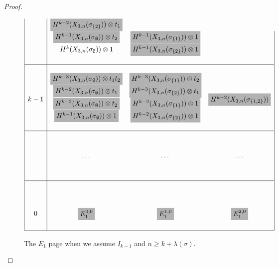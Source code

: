 \begin{proof}
\begin{figure}[ht]
\[\begin{array}{|c|ccc|}
      & \colorbox{isomorphism}{$H^{k-2}(X_{3,n}(\sigma_{\set{2}}))
        \otimes t_1$}
      & \\
      & \colorbox{isomorphism}{$H^{k-1}(X_{3,n}(\sigma_{\emptyset}))
        \otimes t_2 $} 
      & \colorbox{isomorphism}{$H^{k-1}(X_{3,n}(\sigma_{\set{1}}))
        \otimes 1$} &\\
      & H^k(X_{3,n}(\sigma_{\emptyset})) \otimes 1 
      & \colorbox{isomorphism}{$H^{k-1}(X_{3,n}(\sigma_{\set{2}}))
        \otimes 1$} &\\
      & & &\\
      \hline& & & \\
      \multirow{6}{*}{$k-1$}
      & \colorbox{isomorphism}{$H^{k-3}(X_{3,n}(\sigma_{\emptyset}))
        \otimes t_1t_2$}
      & \colorbox{isomorphism}{$H^{k-3}(X_{3,n}(\sigma_{\set{1}}))
        \otimes t_2$}
      & \multirow{6}{*}{\colorbox{isomorphism}{$
        H^{k-2}(X_{3,n}(\sigma_{\set{1,2}}))$}} \\
      & \colorbox{isomorphism}{$H^{k-2}(X_{3,n}(\sigma_{\emptyset}))
        \otimes t_1$}
      & \colorbox{isomorphism}{$H^{k-3}(X_{3,n}(\sigma_{\set{2}}))
        \otimes t_1$} &\\
      & \colorbox{isomorphism}{$H^{k-2}(X_{3,n}(\sigma_{\emptyset}))
        \otimes t_2 $}
      & \colorbox{isomorphism}{$H^{k-2}(X_{3,n}(\sigma_{\set{1}}))
        \otimes 1$}
      &\\
      & \colorbox{isomorphism}{$H^{k-1}(X_{3,n}(\sigma_{\emptyset}))
        \otimes 1$}
      & \colorbox{isomorphism}{$H^{k-2}(X_{3,n}(\sigma_{\set{2}}))
        \otimes 1$}
      &\\
      && & \\
      \hline
      & & & \\
      & \multirow{4}{*}{\dots} 
      & \multirow{4}{*}{\dots} 
      & \multirow{4}{*}{\dots} 
      \\
      & & & \\
      & & & \\
      & & & \\
      & & & \\
      \hline && & \\
      \multirow{6}{*}{$0$} 
      & \multirow{6}{*}{\colorbox{isomorphism}{$E_{1}^{0,0}$}} 
      & \multirow{6}{*}{\colorbox{isomorphism}{$E_1^{1,0}$}}
      & \multirow{6}{*}{\colorbox{isomorphism}{$E_1^{2,0}$}} \\
      & & &\\
      & & &\\
      & & &\\
      & & &\\
      \hline
    \end{array}
    \]
    \caption{The $E_1$ page when we assume $I_{k-1}$ and $n \geq
      k+\lambda(\sigma)$.}
    \label{fig:surjektiv}
  \end{figure}
  

\end{proof}
